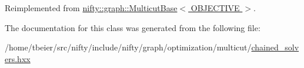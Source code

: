 Reimplemented from \hyperlink{classnifty_1_1graph_1_1MulticutBase_a4c7a44afdc661993b3252dba62b5386f}{nifty\+::graph\+::\+Multicut\+Base$<$ O\+B\+J\+E\+C\+T\+I\+V\+E $>$}.



The documentation for this class was generated from the following file\+:\begin{DoxyCompactItemize}
\item 
/home/tbeier/src/nifty/include/nifty/graph/optimization/multicut/\hyperlink{chained__solvers_8hxx}{chained\+\_\+solvers.\+hxx}\end{DoxyCompactItemize}
